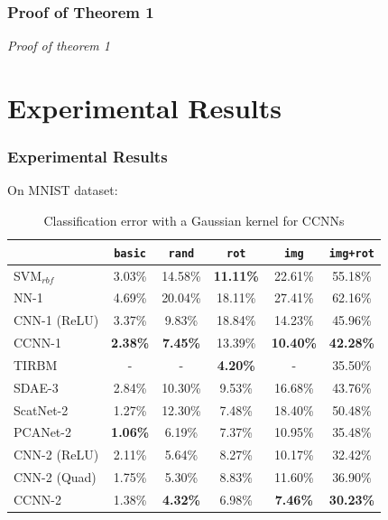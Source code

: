 \documentclass[hyperref={colorlinks}]{beamer}
\begin{document}
\begin{frame}
	\frametitle{Proof of Theorem 1}
	\textit{Proof of theorem 1}
\end{frame}

\section{Experimental Results}
\begin{frame}
	\frametitle{Experimental Results}
	On MNIST dataset:
	\begin{table}
		\begin{tabular}{|l|c|c|c|c|c|}
			\hline
			 & \texttt{basic} & \texttt{rand} & \texttt{rot} & \texttt{img} & \texttt{img+rot} \\
			\hline
			SVM$_{rbf}$ & 3.03\% & 14.58\% & \textbf{11.11\%} & 22.61\% & 55.18\% \\
			NN-1 & 4.69\% & 20.04\% & 18.11\% & 27.41\% & 62.16\% \\
			CNN-1 (ReLU) & 3.37\% & 9.83\% & 18.84\% & 14.23\% & 45.96\% \\
			CCNN-1 & \textbf{2.38\%} & \textbf{7.45\%} & 13.39\% & \textbf{10.40\%} & \textbf{42.28\%} \\
			\hline
			TIRBM & - & - & \textbf{4.20\%} & - & 35.50\% \\
			SDAE-3 & 2.84\% & 10.30\% & 9.53\% & 16.68\% & 43.76\% \\
			ScatNet-2 & 1.27\% & 12.30\% & 7.48\% & 18.40\% & 50.48\% \\
			PCANet-2 & \textbf{1.06\%} & 6.19\% & 7.37\% & 10.95\% & 35.48\% \\
			CNN-2 (ReLU) & 2.11\% & 5.64\% & 8.27\% & 10.17\% & 32.42\% \\
			CNN-2 (Quad) & 1.75\% & 5.30\% & 8.83\% & 11.60\% & 36.90\% \\
			CCNN-2 & 1.38\% & \textbf{4.32\%} & 6.98\% & \textbf{7.46\%} & \textbf{30.23\%} \\
			\hline
		\end{tabular}
		\caption{Classification error with a Gaussian kernel for CCNNs}
		\label{tab:mnist-results}
	\end{table}
\end{frame}
\end{document}
